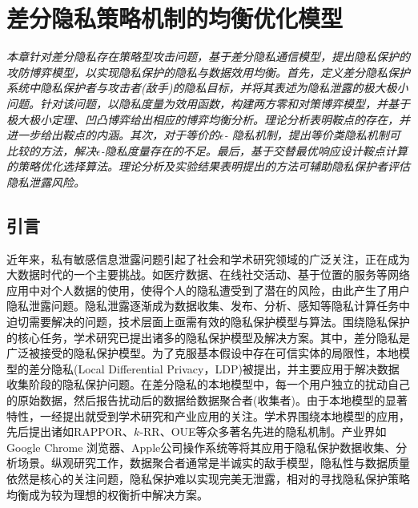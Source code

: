 \chapter{差分隐私策略机制的均衡优化模型}\label{chapter06}
{\em 本章针对差分隐私存在策略型攻击问题，基于差分隐私通信模型，提出隐私保护的攻防博弈模型，以实现隐私保护的隐私与数据效用均衡。首先，定义差分隐私保护系统中隐私保护者与攻击者(敌手)的隐私目标，并将其表述为隐私泄露的极大极小问题。针对该问题，以隐私度量为效用函数，构建两方零和对策博弈模型，并基于极大极小定理、凹凸博弈给出相应的博弈均衡分析。理论分析表明鞍点的存在，并进一步给出鞍点的内涵。其次，对于等价的$\epsilon$- 隐私机制，提出等价类隐私机制可比较的方法，解决$\epsilon$-隐私度量存在的不足。最后，基于交替最优响应设计鞍点计算的策略优化选择算法。理论分析及实验结果表明提出的方法可辅助隐私保护者评估隐私泄露风险。}
\section{引言}
近年来，私有敏感信息泄露问题引起了社会和学术研究领域的广泛关注，正在成为大数据时代的一个主要挑战。如医疗数据、在线社交活动、基于位置的服务等网络应用中对个人数据的使用，使得个人的隐私遭受到了潜在的风险，由此产生了用户隐私泄露问题。隐私泄露逐渐成为数据收集、发布、分析、感知等隐私计算\cite{Lifenghua16}任务中迫切需要解决的问题，技术层面上亟需有效的隐私保护模型与算法。围绕隐私保护的核心任务，学术研究已提出诸多的隐私保护模型及解决方案。其中，差分隐私\cite{dwork2006differential,dwork2006calibrating,dwork2014algorithmic}是广泛被接受的隐私保护模型。为了克服基本假设中存在可信实体的局限性，本地模型的差分隐私\cite{duchi2013local,duchi2013Minimax}(Local Differential Privacy，LDP)被提出，并主要应用于解决数据收集阶段的隐私保护问题。在差分隐私的本地模型中，每一个用户独立的扰动自己的原始数据，然后报告扰动后的数据给数据聚合者(收集者)。由于本地模型的显著特性，一经提出就受到学术研究和产业应用的关注。学术界围绕本地模型的应用，先后提出诸如RAPPOR\cite{fanti2016building,erlingsson2014rappor}、$k$-RR\cite{kairouz2016extremal}、OUE\cite{wang2017locally}等众多著名先进的隐私机制。产业界如Google Chrome 浏览器\cite{erlingsson2014rappor}、Apple公司操作系统\cite{tang2017privacy}等将其应用于隐私保护数据收集、分析场景。纵观研究工作，数据聚合者通常是半诚实的敌手模型，隐私性与数据质量依然是核心的关注问题，隐私保护难以实现完美无泄露，相对的寻找隐私保护策略均衡成为较为理想的权衡折中解决方案。

